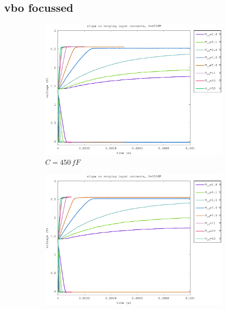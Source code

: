 \documentclass{article}
\begin{document}
\clearpage
\subsection{vbo  focussed}

\begin{figure}[h]
	\centering
	\begin{subfigure}[b]{0.475\textwidth}
	    \centering
	    \includegraphics[width=\textwidth]{fig/vbo_slope_450fF.eps}
	    \caption[Network2]%
	    {$C=450\,fF$}    
	    \label{fig:vbo_slopes_450fF}
	\end{subfigure}
	\hfill
	\begin{subfigure}[b]{0.475\textwidth}  
	    \centering 
	    \includegraphics[width=\textwidth]{fig/vbo_slope_350fF.eps}

\end{subfigure}
\end{figure}
\end{document}
